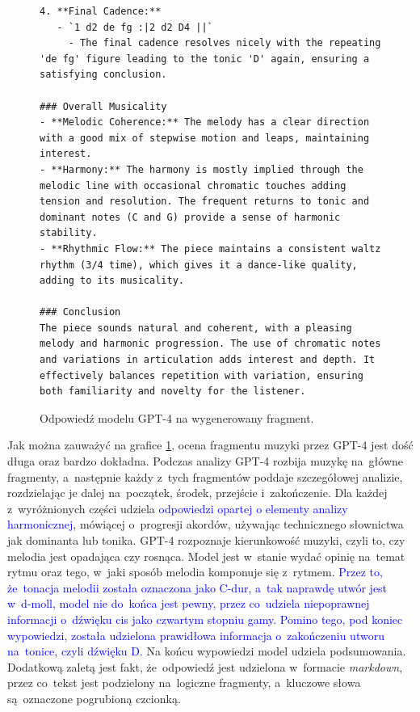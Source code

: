 \documentclass[data-science]{agh-wi} %
\begin{document}
\begin{figure}[ht!]
\begin{verbatim}
4. **Final Cadence:**
   - `1 d2 de fg :|2 d2 D4 ||`
     - The final cadence resolves nicely with the repeating 'de fg' figure leading to the tonic 'D' again, ensuring a satisfying conclusion.

### Overall Musicality
- **Melodic Coherence:** The melody has a clear direction with a good mix of stepwise motion and leaps, maintaining interest.
- **Harmony:** The harmony is mostly implied through the melodic line with occasional chromatic touches adding tension and resolution. The frequent returns to tonic and dominant notes (C and G) provide a sense of harmonic stability.
- **Rhythmic Flow:** The piece maintains a consistent waltz rhythm (3/4 time), which gives it a dance-like quality, adding to its musicality.

### Conclusion
The piece sounds natural and coherent, with a pleasing melody and harmonic progression. The use of chromatic notes and variations in articulation adds interest and depth. It effectively balances repetition with variation, ensuring both familiarity and novelty for the listener.
\end{verbatim}
    \caption{Odpowiedź modelu GPT-4 na wygenerowany fragment.}\label{code:gpt4good}
\end{figure}

Jak można zauważyć na grafice \ref*{code:gpt4good}, ocena fragmentu muzyki przez GPT-4 jest dość długa oraz bardzo dokładna. Podczas analizy GPT-4 rozbija muzykę na~główne fragmenty, a~następnie każdy z~tych fragmentów poddaje szczegółowej analizie, rozdzielając je dalej na~początek, środek, przejście i~zakończenie. Dla każdej z~wyróżnionych części udziela \textcolor{blue}{odpowiedzi opartej o elementy analizy harmonicznej}, mówiącej o~progresji akordów, używając technicznego słownictwa jak dominanta lub tonika. GPT-4 rozpoznaje kierunkowość muzyki, czyli to, czy melodia jest opadająca czy rosnąca. Model jest w~stanie wydać opinię na~temat rytmu oraz tego, w~jaki sposób melodia komponuje się z~rytmem. \textcolor{blue}{Przez to, że~tonacja melodii została oznaczona jako C-dur, a~tak naprawdę utwór jest w~d-moll, model nie do~końca jest pewny, przez co~udziela niepoprawnej informacji o~dźwięku cis jako czwartym stopniu gamy. Pomino tego, pod koniec wypowiedzi, została udzielona prawidłowa informacja o~zakończeniu utworu na~tonice, czyli dźwięku D.} Na końcu wypowiedzi model udziela podsumowania. Dodatkową zaletą jest fakt, że~odpowiedź jest udzielona w~formacie \textit{markdown}, przez co~tekst jest podzielony na~logiczne fragmenty, a~kluczowe słowa są~oznaczone pogrubioną czcionką.
\end{document}
